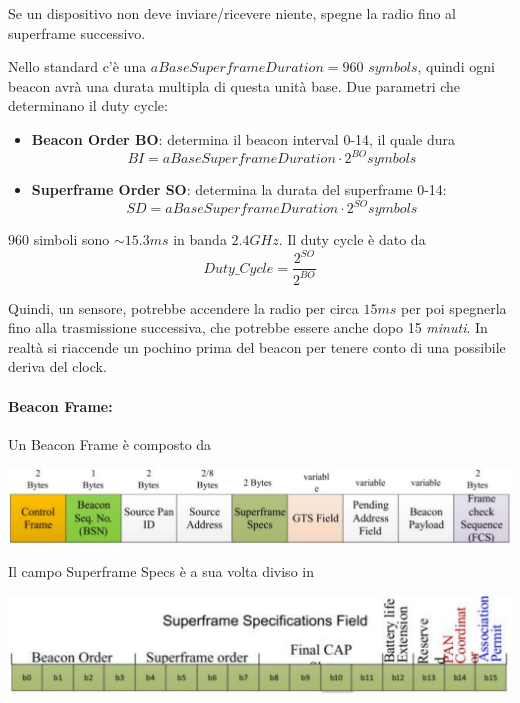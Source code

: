 Se un dispositivo non deve inviare/ricevere niente, spegne la radio fino al superframe successivo.

Nello standard c'è una $aBaseSuperframeDuration = 960$ $symbols$, quindi ogni beacon avrà una durata multipla di questa unità base. Due parametri che determinano il duty cycle: 
\begin{itemize}
	\item \textbf{Beacon Order BO}: determina il beacon interval 0-14, il quale dura
	$$ BI = aBaseSuperframeDuration \cdot 2^{BO} symbols $$
	\item \textbf{Superframe Order SO}: determina la durata del superframe 0-14: 
	$$ SD = aBaseSuperframeDuration \cdot 2^{SO} symbols $$
\end{itemize}
$960$ simboli sono $\sim 15.3 ms$ in banda $2.4 GHz$. Il duty cycle è dato da 
$$ Duty\_Cycle = \frac{2^{SO}}{2^{BO}} $$

Quindi, un sensore, potrebbe accendere la radio per circa $15ms$ per poi spegnerla fino alla trasmissione successiva, che potrebbe essere anche dopo 15 \textit{minuti}. In realtà si riaccende un pochino prima del beacon per tenere conto di una possibile deriva del clock.

\paragraph{Beacon Frame:} Un Beacon Frame è composto da
\begin{center}
	\includegraphics[width=0.99\linewidth]{img/wpan/zbframe}
\end{center}

Il campo Superframe Specs è a sua volta diviso in 
\begin{center}
	\includegraphics[width=0.99\linewidth]{img/wpan/zssf}
\end{center}

